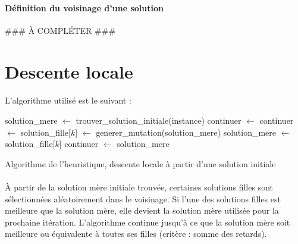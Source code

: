 \paragraph{Définition du voisinage d'une solution}
\#\#\# À COMPLÉTER \#\#\#


\section{Descente locale}

\paragraph{}
L'algorithme utilisé est le suivant :

\begin{algorithm}[H] %
\begin{algorithmic}
\STATE solution\_mere $ \leftarrow $ trouver\_solution\_initiale(instance)
\STATE continuer $ \leftarrow $ \TRUE
{}
\STATE continuer $ \leftarrow $ \FALSE
\STATE {}
\STATE solution\_fille[$ k $] $ \leftarrow $ generer\_mutation(solution\_mere)
\STATE {}
\ENDFOR
\STATE {}
\STATE solution\_mere $ \leftarrow $ solution\_fille[$ k $]
\STATE continuer $ \leftarrow $ \TRUE { } 
\ENDIF
\ENDFOR
\ENDWHILE
\RETURN solution\_mere
\end{algorithmic}
\caption{\label{alg:heuristique}Algorithme de l'heuristique, descente locale à partir d'une solution initiale}
\end{algorithm}

\paragraph{}
À partir de la solution \og mère \fg{} initiale trouvée, certaines solutions \og filles \fg{} sont sélectionnées aléatoirement dans le voisinage.
Si l'une des solutions filles est meilleure que la solution mère, elle devient la solution mère utilisée pour la prochaine itération.
L'algorithme continue jusqu'à ce que la solution mère soit meilleure ou équivalente à toutes ses filles (critère : somme des retards).